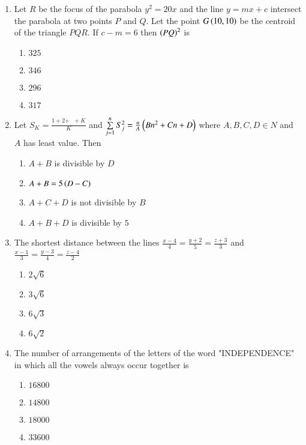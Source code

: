\documentclass[journal]{IEEEtran}
\begin{document}
\begin{enumerate}
{}
\item{
Let $R$ be the focus of the parabola $y^2=20x$ and the line $y=mx+c$ intersect the parabola at two points $P$ and $Q$. Let the point $G\left(10,10\right)$ be the centroid of the triangle $PQR$. If $c-m=6$ then $\left(PQ\right)^2$ is
\begin{multicols}{4}
\begin{enumerate}
\item $325$
\item $346$
\item $296$
\item $317$
\end{enumerate}
\end{multicols}
}
\item{
Let $S_K=\frac{1+2+_{...}+K}{K}$ and $\sum\limits_{j=1}^n S_j^2=\frac{n}{A}\left(Bn^2+Cn+D\right)$ where $A,B,C,D\in N$ and $A$ has least value. Then
\begin{multicols}{2}
\begin{enumerate}
\item $A+B$ is divisible by $D$
\item $A+B=5\left(D-C\right)$
\item $A+C+D$ is not divisible by $B$
\item $A+B+D$ is divisible by $5$
\end{enumerate}
\end{multicols}
}
\item{
The shortest distance between the lines $\frac{x-4}{4}=\frac{y+2}{5}=\frac{z+3}{3}$ and $\frac{x-1}{3}=\frac{y-3}{4}=\frac{z-4}{2}$
\begin{multicols}{4}
\begin{enumerate}
\item $2\sqrt{6}$
\item $3\sqrt{6}$
\item $6\sqrt{3}$
\item $6\sqrt{2}$
\end{enumerate}
\end{multicols}
}
\item{
The number of arrangements of the letters of the word "INDEPENDENCE" in which all the vowels always occur together is
\begin{multicols}{4}
\begin{enumerate}
\item $16800$
\item $14800$
\item $18000$
\item $33600$
\end{enumerate}

\end{multicols}}
\end{enumerate}
\end{document}
